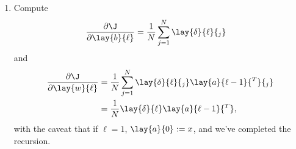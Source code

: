 \begin{enumerate}
	\item Compute
	\begin{align*}
		\frac{\partial\J}{\partial\lay{b}{\ell}}&=\frac{1}{N}\sum_{j=1}^N\lay{\delta}{\ell}{_j}
	\end{align*}
	and
	\begin{align*}
		\frac{\partial\J}{\partial\lay{w}{\ell}}&=\frac{1}{N}\sum_{j=1}^N\lay{\delta}{\ell}{_j}\lay{a}{\ell-1}{^T}{_j}\\
		&=\frac{1}{N}\lay{\delta}{\ell}\lay{a}{\ell-1}{^T},
	\end{align*}
	with the caveat that if $\ell=1$, $\lay{a}{0}:=x$, and we've completed the recursion.
\end{enumerate}






\begin{comment}
	







\subsection{Backward Propagation}
As the general derivation for backpropagation can be easily (if not tediously) generalized from \cref{sec:backPropDerivation} using induction, we give the general outline for computational purposes.

Let $\L:\R^{m_L}\times\R^{m_L}\to\R$ be a generic loss function, and suppose our cost function is given by the usual
$$\J(W,b)=\frac{1}{n}\sum_{j=1}^n\L(\hat{y}_j,y_j).$$
Then from previous computations, we have the following gradients for any $\ell\in\{1,2,...,L\}$, that
\begin{align*}
	\frac{\partial\J}{\partial\lay{W}{\ell}}&=\frac{1}{n}\lay{\delta}{\ell}\lay{a}{\ell-1}{^T}\\
	\frac{\partial\J}{\partial\lay{b}{\ell}}&=\frac{1}{n}\sum_{j=1}^n\lay{\delta}{\ell}{_j}
\end{align*}
where we impose the notation of
$$\lay{a}{0}:=x.$$
So we need only give a full characterization of $\lay{\delta}{\ell}.$. To this end, we define recursively starting at layer-$L$ by
\begin{align*}
	\lay{\delta}{L}{^T}&:=d(\L_y)_{\lay{a}{L}}\cdot d\lay{g}{L}_{\lay{z}{L}},\\
	\lay{\delta}{L-1}{^T}&:=\lay{\delta}{L}{^T}\cdot\lay{W}{L}\cdot d\lay{g}{L-1}_{\lay{z}{L-1}},\\
	&\vdots\\
	\lay{\delta}{\ell}{^T}&:=\lay{\delta}{\ell+1}{^T}\lay{W}{\ell+1}d\lay{g}{\ell}_{\lay{z}{\ell}},\\
	&\vdots\\
	\lay{\delta}{1}{^T}&:=\lay{\delta}{2}{^T}\lay{W}{2}d\lay{g}{1}_{\lay{z}{1}},
\end{align*}
as desired.



\end{comment}



